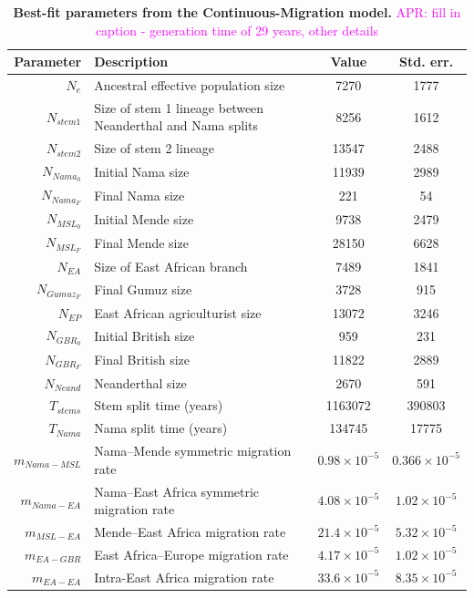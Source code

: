 \documentclass[]{article}
\newcommand{\aprcomment}[1]{{\textcolor{magenta}{APR: #1}}}
\begin{document}
\begin{table}[ht]
\caption{
    \label{tab:continuous_migration}
    \textbf{Best-fit parameters from the Continuous-Migration model.}
    \aprcomment{fill in caption - generation time of 29 years, other details}
}
\centering
\begin{tabular}[t]{rP{8cm}cc}
    \toprule
    Parameter & Description & Value & Std. err.\\
    \midrule
    $N_e$ & Ancestral effective population size & 7270 & 1777 \\
    $N_{stem1}$ & Size of stem 1 lineage between Neanderthal and Nama splits & 8256 & 1612 \\
    $N_{stem2}$ & Size of stem 2 lineage & 13547 & 2488 \\
    $N_{Nama_0}$ & Initial Nama size & 11939 & 2989 \\
    $N_{Nama_F}$ & Final Nama size & 221 & 54 \\
    $N_{MSL_0}$ & Initial Mende size & 9738 & 2479 \\
    $N_{MSL_F}$ & Final Mende size & 28150 & 6628 \\
    $N_{EA}$ & Size of East African branch & 7489 & 1841 \\
    $N_{Gumuz_F}$ & Final Gumuz size & 3728 & 915 \\
    $N_{EP}$ & East African agriculturist size & 13072 & 3246 \\
    $N_{GBR_0}$ & Initial British size & 959 & 231 \\
    $N_{GBR_F}$ & Final British size & 11822 & 2889 \\
    $N_{Neand}$ & Neanderthal size & 2670 & 591 \\
    $T_{stems}$ & Stem split time (years) & 1163072 & 390803 \\
    $T_{Nama}$ & Nama split time (years) & 134745 & 17775 \\
    $m_{Nama-MSL}$ & Nama--Mende symmetric migration rate & $0.98\times10^{-5}$ & $0.366\times10^{-5}$ \\
    $m_{Nama-EA}$ & Nama--East Africa symmetric migration rate & $4.08\times10^{-5}$ & $1.02\times10^{-5}$ \\
    $m_{MSL-EA}$ & Mende--East Africa migration rate & $21.4\times10^{-5}$ & $5.32\times10^{-5}$ \\
    $m_{EA-GBR}$ & East Africa--Europe migration rate & $4.17\times10^{-5}$ & $1.02\times10^{-5}$ \\
    $m_{EA-EA}$ & Intra-East Africa migration rate & $33.6\times10^{-5}$ & $8.35\times10^{-5}$ \\

\end{tabular}
\end{table}
\end{document}
